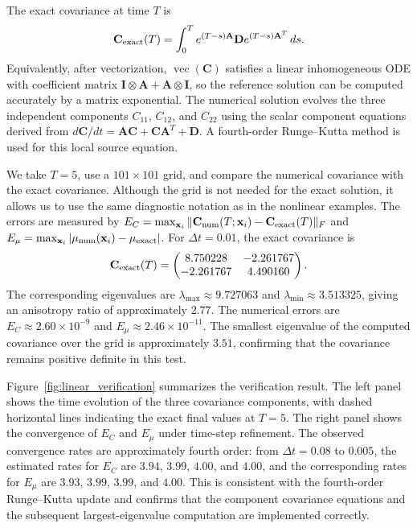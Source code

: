 \documentclass[a4paper,11pt]{article}
\numberwithin{equation}{section}
\theoremstyle{plain}
\theoremstyle{definition}
\theoremstyle{remark}
\newcommand{\bx}{\mathbf{x}}
\newcommand{\bA}{\mathbf{A}}
\newcommand{\bC}{\mathbf{C}}
\newcommand{\bD}{\mathbf{D}}
\newcommand{\bI}{\mathbf{I}}
\begin{document}
The exact covariance at time \(T\) is
\[
    \bC_{\rm exact}(T)
    =
    \int_0^T e^{(T-s)\bA}\bD e^{(T-s)\bA^T}\,ds.
\]
Equivalently, after vectorization, \(\operatorname{vec}(\bC)\) satisfies a linear inhomogeneous ODE with coefficient matrix \(\bI\otimes\bA+\bA\otimes\bI\), so the reference solution can be computed accurately by a matrix exponential.  The numerical solution evolves the three independent components \(C_{11}\), \(C_{12}\), and \(C_{22}\) using the scalar component equations derived from \(d\bC/dt=\bA\bC+\bC\bA^T+\bD\).  A fourth-order Runge--Kutta method is used for this local source equation.

We take \(T=5\), use a \(101\times101\) grid, and compare the numerical covariance with the exact covariance.  Although the grid is not needed for the exact solution, it allows us to use the same diagnostic notation as in the nonlinear examples.  The errors are measured by \(E_C=\max_{\bx_i}\|\bC_{\rm num}(T;\bx_i)-\bC_{\rm exact}(T)\|_F\) and \(E_\mu=\max_{\bx_i}|\mu_{\rm num}(\bx_i)-\mu_{\rm exact}|\).  For \(\Delta t=0.01\), the exact covariance is
\[
    \bC_{\rm exact}(T)
    =
    \begin{pmatrix}
        8.750228 & -2.261767\\
       -2.261767 &  4.490160
    \end{pmatrix}.
\]
The corresponding eigenvalues are \(\lambda_{\max}\approx9.727063\) and \(\lambda_{\min}\approx3.513325\), giving an anisotropy ratio of approximately \(2.77\).  The numerical errors are \(E_C\approx2.60\times10^{-9}\) and \(E_\mu\approx2.46\times10^{-11}\).  The smallest eigenvalue of the computed covariance over the grid is approximately \(3.51\), confirming that the covariance remains positive definite in this test.

Figure~\ref{fig:linear_verification} summarizes the verification result.  The left panel shows the time evolution of the three covariance components, with dashed horizontal lines indicating the exact final values at \(T=5\).  The right panel shows the convergence of \(E_C\) and \(E_\mu\) under time-step refinement.  The observed convergence rates are approximately fourth order: from \(\Delta t=0.08\) to \(0.005\), the estimated rates for \(E_C\) are \(3.94\), \(3.99\), \(4.00\), and \(4.00\), and the corresponding rates for \(E_\mu\) are \(3.93\), \(3.99\), \(3.99\), and \(4.00\).  This is consistent with the fourth-order Runge--Kutta update and confirms that the component covariance equations and the subsequent largest-eigenvalue computation are implemented correctly.
\end{document}
